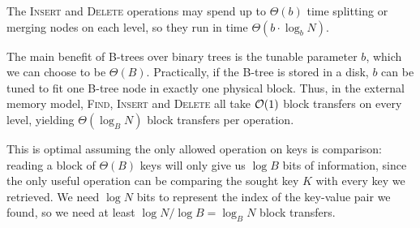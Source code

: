 The \textsc{Insert} and \textsc{Delete} operations may spend up to
$\Theta(b)$ time splitting or merging nodes on each level, so they run in
time $\Theta(b \cdot \log_b N)$.

The main benefit of B-trees over binary trees is the tunable parameter
$b$, which we can choose to be $\Theta(B)$. Practically, if the B-tree
is stored in a disk, $b$ can be tuned to fit one B-tree node in exactly one
physical block. Thus, in the external memory model, \textsc{Find},
\textsc{Insert} and \textsc{Delete} all take $\mathcal{O}(1)$ block transfers
on every level, yielding $\Theta(\log_B N)$ block transfers per operation.

This is optimal assuming the only allowed operation
on keys is comparison: reading a block of $\Theta(B)$ keys will only
give us $\log B$ bits of information, since the only useful operation
can be comparing the sought key $K$ with every key we retrieved.
We need $\log N$ bits to represent the index of the key-value pair we found,
so we need at least $\log N/\log B=\log_B N$ block transfers.
